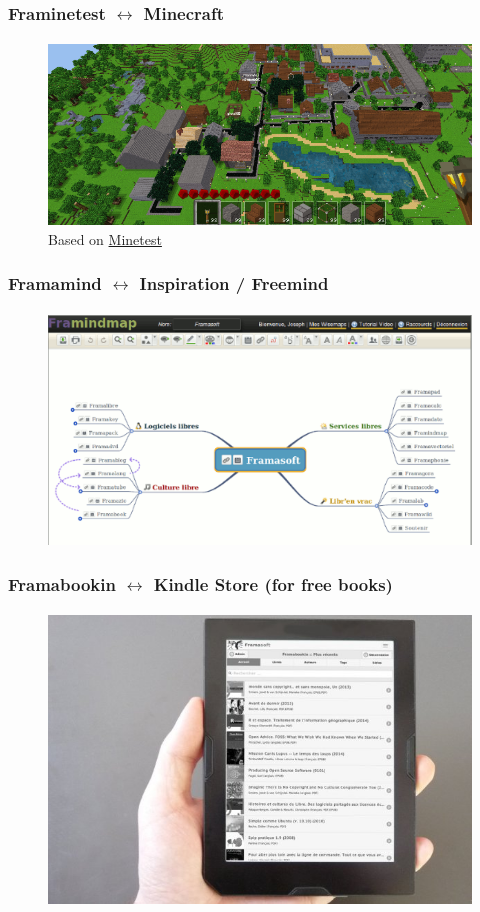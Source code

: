 \documentclass{beamer}
\begin{document}
	\begin{frame}
	\frametitle{Framinetest $\leftrightarrow$ Minecraft}
	\framesubtitle{}
	        \begin{figure}[h]
                \centering
                \includegraphics[width=.8\textwidth]{./images/framinetest}
		\caption{Based on \href{http://www.minetest.net}{Minetest}}
        	\end{figure}
	\end{frame}

	\begin{frame}
	\frametitle{Framamind $\leftrightarrow$ Inspiration / Freemind}
	\framesubtitle{}
	        \begin{figure}[h]
                \centering
                \includegraphics[width=.8\textwidth]{./images/framamind}
        	\end{figure}
	\end{frame}

	\begin{frame}
	\frametitle{Framabookin $\leftrightarrow$ Kindle Store (for free books)}
	\framesubtitle{}
	        \begin{figure}[h]
                \centering
                \includegraphics[width=.8\textwidth]{./images/framabookin}
        	\end{figure}
	\end{frame}
\end{document}
